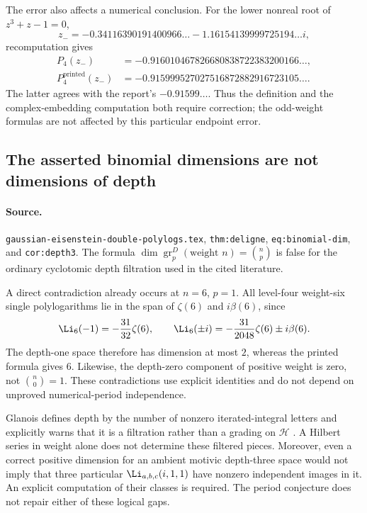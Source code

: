 The error also affects a numerical conclusion. For the lower nonreal
root of $z^3+z-1=0$,
\[
z_-=-0.34116390191400966\ldots-1.16154139999725194\ldots i,
\]
recomputation gives
\begin{align*}
 P_4(z_-)&=-0.916010467826680838722383200166\ldots,\\
 P_4^{\mathrm{printed}}(z_-)&=-0.915999527027516872882916723105\ldots.
\end{align*}
The latter agrees with the report's $-0.91599\ldots$.
Thus the definition and the complex-embedding computation both require
correction; the odd-weight formulas are not affected by this particular
endpoint error.

\subsection{The asserted binomial dimensions are not dimensions of depth}
\label{audit:poly:depth-dimensions}

\paragraph{Source.}
\texttt{gaussian-eisenstein-double-polylogs.tex},
\texttt{thm:deligne}, \texttt{eq:binomial-dim}, and
\texttt{cor:depth3}. The formula
$\dim\operatorname{gr}^D_p(\text{weight }n)=\binom np$
is false for the ordinary cyclotomic depth filtration used in the cited
literature.

A direct contradiction already occurs at $n=6$, $p=1$. All level-four
weight-six single polylogarithms lie in the span of $\zeta(6)$ and
$i\beta(6)$, since
\[
 \Li_6(-1)=-\frac{31}{32}\zeta(6),\qquad
 \Li_6(\pm i)=-\frac{31}{2048}\zeta(6)\pm i\beta(6).
\]
The depth-one space therefore has dimension at most $2$, whereas the
printed formula gives $6$. Likewise, the depth-zero component of positive
weight is zero, not $\binom n0=1$.
These contradictions use explicit identities and do not depend on
unproved numerical-period independence.

Glanois defines depth by the number of nonzero iterated-integral letters
and explicitly warns that it is a filtration rather than a grading on
$\mathcal H$ \cite[\S3.1]{audit-glanois-2016}.
A Hilbert series in weight alone does not determine these filtered
pieces. Moreover, even a correct positive dimension for an ambient
motivic depth-three space would not imply that three particular
$\Li_{a,b,c}(i,1,1)$ have nonzero independent images in it.
An explicit computation of their classes is required.
The period conjecture does not repair either of these logical gaps.

